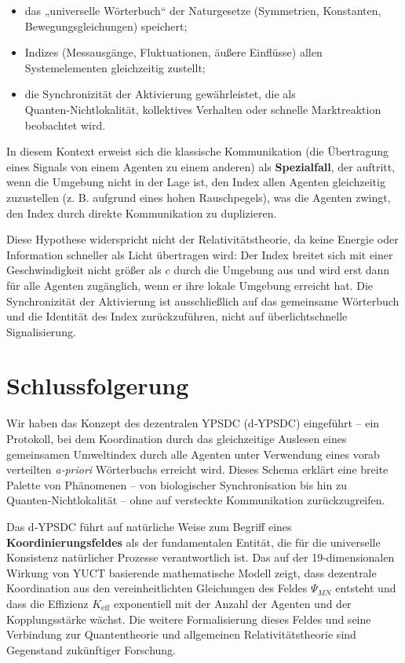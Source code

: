 \documentclass[12pt,a4paper]{article}
\begin{document}
	\begin{itemize}
		\item das „universelle Wörterbuch“ der Naturgesetze (Symmetrien, Konstanten, Bewegungsgleichungen) speichert;
		\item Indizes (Messausgänge, Fluktuationen, äußere Einflüsse) allen Systemelementen gleichzeitig zustellt;
		\item die Synchronizität der Aktivierung gewährleistet, die als Quanten‑Nichtlokalität, kollektives Verhalten oder schnelle Marktreaktion beobachtet wird.
	\end{itemize}
	
	In diesem Kontext erweist sich die klassische Kommunikation (die Übertragung eines Signals von einem Agenten zu einem anderen) als \textbf{Spezialfall}, der auftritt, wenn die Umgebung nicht in der Lage ist, den Index allen Agenten gleichzeitig zuzustellen (z. B. aufgrund eines hohen Rauschpegels), was die Agenten zwingt, den Index durch direkte Kommunikation zu duplizieren.
	
	Diese Hypothese widerspricht nicht der Relativitätstheorie, da keine Energie oder Information schneller als Licht übertragen wird: Der Index breitet sich mit einer Geschwindigkeit nicht größer als \(c\) durch die Umgebung aus und wird erst dann für alle Agenten zugänglich, wenn er ihre lokale Umgebung erreicht hat. Die Synchronizität der Aktivierung ist ausschließlich auf das gemeinsame Wörterbuch und die Identität des Index zurückzuführen, nicht auf überlichtschnelle Signalisierung.
	
	\section{Schlussfolgerung}
	
	Wir haben das Konzept des dezentralen YPSDC (d‑YPSDC) eingeführt – ein Protokoll, bei dem Koordination durch das gleichzeitige Auslesen eines gemeinsamen Umweltindex durch alle Agenten unter Verwendung eines vorab verteilten \emph{a‑priori} Wörterbuchs erreicht wird. Dieses Schema erklärt eine breite Palette von Phänomenen – von biologischer Synchronisation bis hin zu Quanten‑Nichtlokalität – ohne auf versteckte Kommunikation zurückzugreifen.
	
	Das d‑YPSDC führt auf natürliche Weise zum Begriff eines \textbf{Koordinierungsfeldes} als der fundamentalen Entität, die für die universelle Konsistenz natürlicher Prozesse verantwortlich ist. Das auf der 19‑dimensionalen Wirkung von YUCT basierende mathematische Modell zeigt, dass dezentrale Koordination aus den vereinheitlichten Gleichungen des Feldes \(\Psi_{MN}\) entsteht und dass die Effizienz \(K_{\mathrm{eff}}\) exponentiell mit der Anzahl der Agenten und der Kopplungsstärke wächst. Die weitere Formalisierung dieses Feldes und seine Verbindung zur Quantentheorie und allgemeinen Relativitätstheorie sind Gegenstand zukünftiger Forschung.
	
\end{document}
